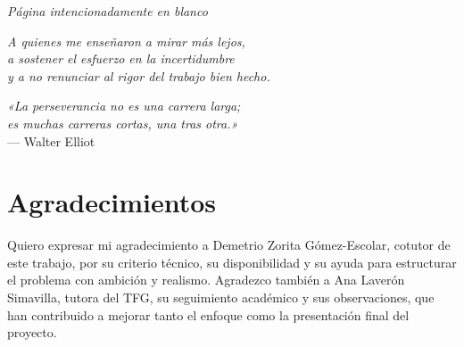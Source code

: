\clearpage
\thispagestyle{empty}
\vspace*{\fill}
\begin{center}
    {\small\textit{Página intencionadamente en blanco}}
\end{center}
\vspace*{\fill}
\clearpage

\clearpage
\thispagestyle{empty}
\vspace*{\fill}
\begin{center}
    \emph{A quienes me enseñaron a mirar más lejos,\\
    a sostener el esfuerzo en la incertidumbre\\
    y a no renunciar al rigor del trabajo bien hecho.}
\end{center}
\vspace*{\fill}
\clearpage

\clearpage
\thispagestyle{empty}
\vspace*{\fill}
\begin{flushright}
    \emph{«La perseverancia no es una carrera larga;\\
    es muchas carreras cortas, una tras otra.»}\\[0.5em]
    --- Walter Elliot
\end{flushright}
\vspace*{\fill}
\clearpage

\chapter*{Agradecimientos}
\thispagestyle{empty}
Quiero expresar mi agradecimiento a Demetrio Zorita Gómez-Escolar, cotutor de este trabajo, por su criterio técnico, su disponibilidad y su ayuda para estructurar el problema con ambición y realismo. Agradezco también a Ana Laverón Simavilla, tutora del TFG, su seguimiento académico y sus observaciones, que han contribuido a mejorar tanto el enfoque como la presentación final del proyecto.

